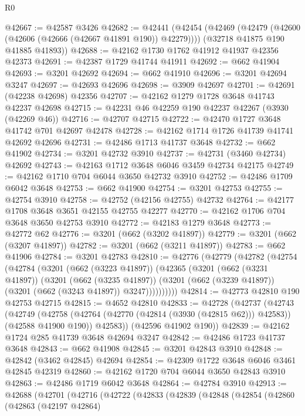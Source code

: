 \begin{lexlean}{R0}
\begin{coremodule}
@42667 := @42587 @3426
@42682 := @42441
    (@42454
      (@42469 (@42479 (@42600 (@42606 (@42666 (@42667 @41891 @190)) @42279))))
      (@32718 @41875 @190 @41885 @41893))
@42688 := @42162 @1730 @1762 @41912 @41937 @42356 @42373
@42691 := @42387 @1729 @41744 @41911
@42692 := @662 @41904
@42693 := @3201 @42692
@42694 := @662 @41910
@42696 := @3201 @42694 @3247
@42697 := @42693 @42696
@42698 := @3909 @42697
@42701 := @42691 (@42238 @42698) @42356
@42707 := @42162 @1279 @1728 @3648 @41743 @42237 @42698
@42715 := @42231 @46 @42259 @190 @42237 @42267 (@3930 (@42269 @46))
@42716 := @42707 @42715
@42722 := @42470 @1727 @3648 @41742 @701 @42697 @42478
@42728 := @42162 @1714 @1726 @41739 @41741 @42692 @42696
@42731 := @42486 @1713 @41737 @3648
@42732 := @662 @41902
@42734 := @3201 @42732 @3910
@42737 := @42731 (@3460 @42734) @42692
@42743 := @42163 @1712 @3648 @6046 @3459 @42734 @42175
@42749 := @42162 @1710 @704 @6044 @3650 @42732 @3910
@42752 := @42486 @1709 @6042 @3648
@42753 := @662 @41900
@42754 := @3201 @42753
@42755 := @42754 @3910
@42758 := @42752 (@42156 @42755) @42732
@42764 := @42177 @1708 @3648 @3651 @42155 @42755 @42277
@42770 := @42162 @1706 @704 @3648 @3650 @42753 @3910
@42772 := @42183 @1279 @3648
@42773 := @42772 @62
@42776 := @3201 (@662 (@3202 @41897))
@42779 := @3201 (@662 (@3207 @41897))
@42782 := @3201 (@662 (@3211 @41897))
@42783 := @662 @41906
@42784 := @3201 @42783
@42810 := @42776
    (@42779
      (@42782
        (@42754
          (@42784
            (@3201
              (@662 (@3223 @41897))
              (@42365
                (@3201
                  (@662 (@3231 @41897))
                  (@3201
                    (@662 (@3235 @41897))
                    (@3201 (@662 (@3239 @41897)) (@3201 (@662 (@3243 @41897)) @3247))))))))))
@42814 := @42773 @42810 @190 @42753 @42715
@42815 := @4652 @42810
@42833 := @42728
    (@42737
      (@42743
        (@42749
          (@42758 (@42764 (@42770 (@42814 (@3930 (@42815 @62))) @42583)) (@42588 @41900 @190))
          @42583))
      (@42596 @41902 @190))
@42839 := @42162 @1724 @285 @41739 @3648 @42694 @3247
@42842 := @42486 @1723 @41737 @3648
@42843 := @662 @41908
@42845 := @3201 @42843 @3910
@42848 := @42842 (@3462 @42845) @42694
@42854 := @42309 @1722 @3648 @6046 @3461 @42845 @42319
@42860 := @42162 @1720 @704 @6044 @3650 @42843 @3910
@42863 := @42486 @1719 @6042 @3648
@42864 := @42784 @3910
@42913 := @42688
    (@42701
      (@42716
        (@42722
          (@42833
            (@42839
              (@42848
                (@42854
                  (@42860
                    (@42863
                      (@42197 @42864)

\end{coremodule}
\end{lexlean}
